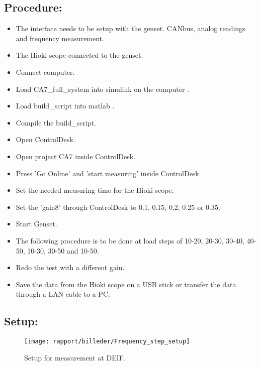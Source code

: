 \subsection*{Procedure:}

\begin{itemize}
	\item The interface needs to be setup with the genset. CANbus, analog readings and frequency measurement.  
	\item The Hioki scope connected to the genset.
	\item Connect computer.
	\item Load CA7\_full\_system into simulink on the computer .
	\item Load build\_script into matlab . 
	\item Compile the build\_script.
	\item Open ControlDesk.
	\item Open project CA7 inside ControlDesk.
	\item Press 'Go Online' and 'start measuring' inside ControlDesk. 
	\item Set the needed measuring time for the Hioki scope.
	\item Set the 'gain8' through ControlDesk to 0.1, 0.15, 0.2, 0.25 or 0.35.  
	\item Start Genset.
	\item The following procedure is to be done at load steps of 10-20, 20-30, 30-40, 40-50, 10-30, 30-50 and 10-50.
	\item Redo the test with a different gain.
	\item Save the data from the Hioki scope on a USB stick or transfer the data through a LAN cable to a PC.  



\end{itemize}


\subsection*{Setup:}
\begin{figure}[H]
\centering
\texttt{[image: rapport/billeder/Frequency\_step\_setup]}
\caption{Setup for measurement at DEIF.}
\label{fig:Frequency_step_setup}
\end{figure} 


